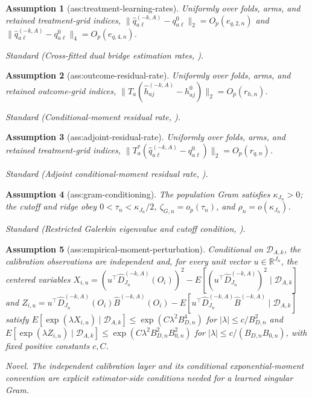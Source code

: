 \documentclass{article}
\newtheorem{assumption}{Assumption}
\begin{document}
\begin{assumption}[ass:treatment-learning-rates]\label{ass:treatment-learning-rates}
Uniformly over folds, arms, and retained treatment-grid indices, \(\|\widehat q_{a\ell}^{(-k,A)}-q^0_{a\ell}\|_2=O_p(e_{q,2,n})\) and \(\|\widehat q_{a\ell}^{(-k,A)}-q^0_{a\ell}\|_4=O_p(e_{q,4,n})\).
\par\smallskip\noindent\emph{Standard} (Cross-fitted dual bridge estimation rates, \cite{BennettEtAl2023SourceConditionDR}).
\end{assumption}

\begin{assumption}[ass:outcome-residual-rate]\label{ass:outcome-residual-rate}
Uniformly over folds, arms, and retained outcome-grid indices, \(\|T_a(\widehat h_{aj}^{(-k,A)}-h^0_{aj})\|_2=O_p(r_{h,n})\).
\par\smallskip\noindent\emph{Standard} (Conditional-moment residual rate, \cite{BennettEtAl2023SourceConditionDR}).
\end{assumption}

\begin{assumption}[ass:adjoint-residual-rate]\label{ass:adjoint-residual-rate}
Uniformly over folds, arms, and retained treatment-grid indices, \(\|T_a^*(\widehat q_{a\ell}^{(-k,A)}-q^0_{a\ell})\|_2=O_p(r_{q,n})\).
\par\smallskip\noindent\emph{Standard} (Adjoint conditional-moment residual rate, \cite{BennettEtAl2023SourceConditionDR}).
\end{assumption}

\begin{assumption}[ass:gram-conditioning]\label{ass:gram-conditioning}
The population Gram satisfies \(\kappa_{J_n}>0\); the cutoff and ridge obey \(0<\tau_n<\kappa_{J_n}/2\), \(\zeta_{G,n}=o_p(\tau_n)\), and \(\rho_n=o(\kappa_{J_n})\).
\par\smallskip\noindent\emph{Standard} (Restricted Galerkin eigenvalue and cutoff condition, \cite{AiChen2012SequentialMoments}).
\end{assumption}

\begin{assumption}[ass:empirical-moment-perturbation]\label{ass:empirical-moment-perturbation}
Conditional on \(\mathcal D_{A,k}\), the calibration observations are independent and, for every unit vector \(u\in\mathbb R^{J_n}\), the centered variables \(X_{i,u}=(u^\top\widehat D_{J_n}^{(-k,A)}(O_i))^2-E[(u^\top\widehat D_{J_n}^{(-k,A)})^2\mid\mathcal D_{A,k}]\) and \(Z_{i,u}=u^\top\widehat D_{J_n}^{(-k,A)}(O_i)\widehat B^{(-k,A)}(O_i)-E[u^\top\widehat D_{J_n}^{(-k,A)}\widehat B^{(-k,A)}\mid\mathcal D_{A,k}]\) satisfy \(E[\exp(\lambda X_{i,u})\mid\mathcal D_{A,k}]\le\exp(C\lambda^2B_{D,n}^4)\) for \(|\lambda|\le c/B_{D,n}^2\) and \(E[\exp(\lambda Z_{i,u})\mid\mathcal D_{A,k}]\le\exp(C\lambda^2B_{D,n}^2B_{0,n}^2)\) for \(|\lambda|\le c/(B_{D,n}B_{0,n})\), with fixed positive constants \(c,C\).
\par\smallskip\noindent\emph{Novel.} The independent calibration layer and its conditional exponential-moment convention are explicit estimator-side conditions needed for a learned singular Gram.
\end{assumption}
\end{document}
